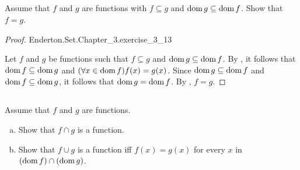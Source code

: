 \documentclass{report}
\begin{document}
\subsection{}%
\label{sub:exercise-3.13}

Assume that $f$ and $g$ are functions with $f \subseteq g$ and
  $\mathop{\text{dom}}{g} \subseteq \mathop{\text{dom}}{f}$.
Show that $f = g$.

\begin{proof}

    {Enderton.Set.Chapter\_3.exercise\_3\_13}

  Let $f$ and $g$ be functions such that $f \subseteq g$ and
    $\mathop{\text{dom}}{g} \subseteq \mathop{\text{dom}}{f}$.
  By , it follows that $\mathop{\text{dom}}{f} \subseteq \mathop{\text{dom}}{g}$
    and $(\forall x \in \mathop{\text{dom}}{f}) f(x) = g(x)$.
  Since $\mathop{\text{dom}}{g} \subseteq \mathop{\text{dom}}{f}$ and $\mathop{\text{dom}}{f} \subseteq \mathop{\text{dom}}{g}$, it follows
    that $\mathop{\text{dom}}{g} = \mathop{\text{dom}}{f}$.
  By , $f = g$.

\end{proof}

\subsection{}%
\label{sub:exercise-3.14}

Assume that $f$ and $g$ are functions.

\begin{enumerate}[(a)]
  \item Show that $f \cap g$ is a function.
  \item Show that $f \cup g$ is a function iff $f(x) = g(x)$ for every $x$ in
    $(\mathop{\text{dom}}{f}) \cap (\mathop{\text{dom}}{g})$.
\end{enumerate}
\end{document}
